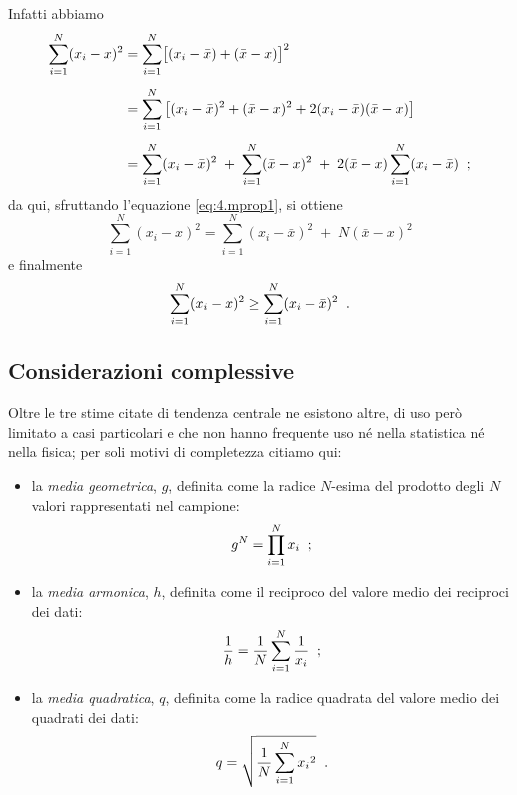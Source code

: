Infatti abbiamo
\begin{align*}
  \sum_{i=1}^N (x_i-x) ^2 &=
    \sum_{i=1}^N \bigl[ (x_i-\bar x) +
    (\bar x-x) \bigr] ^2 \\[1ex]
  &= \sum_{i=1}^N \left[ (x_i-\bar x) ^2 +
    (\bar x - x) ^2
    + 2 (x_i-\bar x) (\bar x - x) \right]
    \\[1ex]
  &= \sum_{i=1}^N (x_i-\bar x) ^2
    \;+\; \sum_{i=1}^N (\bar x-x) ^2
    \;+\; 2(\bar x-x)\sum_{i=1}^N (x_i-\bar x) \;\; ;
\end{align*}
da qui, sfruttando l'equazione \eqref{eq:4.mprop1}, si
ottiene
\begin{equation} \label{eq:4.mprop2}
  \sum_{i=1}^N (x_i-x) ^2 = \sum_{i=1}^N
    (x_i-\bar x)^2 \;+\; N(\bar x - x)^2
\end{equation}
e finalmente
\begin{equation*}
  \sum_{i=1}^N (x_i-x) ^2 \ge \sum_{i=1}^N
    (x_i-\bar x)^2 \;\; .
\end{equation*}%
%
%

\subsection{Considerazioni complessive}
Oltre le tre stime citate di tendenza centrale ne esistono
altre, di uso per\`o limitato a casi particolari e che non
hanno frequente uso n\'e nella statistica n\'e nella fisica;
per soli motivi di completezza citiamo qui:
\begin{itemize}
\item la \emph{media geometrica},%
  $g$, definita come la radice $N$-esima del prodotto degli
  $N$ valori rappresentati nel campione:
  \begin{equation*}
    g^N = \prod_{i=1}^N x_i \;\; ;
  \end{equation*}
\item la \emph{media armonica},%
  $h$, definita come il reciproco del valore medio dei
  reciproci dei dati:
  \begin{equation*}
    \frac{1}{h} = \frac{1}{N} \sum_{i=1}^N \frac{1}{x_i} \;\;
    ;
  \end{equation*}
\item la \emph{media quadratica},%
  $q$, definita come la radice quadrata del valore medio dei
  quadrati dei dati:
  \begin{equation*}
    q = \sqrt{ \frac{1}{N} \sum_{i=1}^N {x_i}^2 } \;\; .
  \end{equation*}
\end{itemize}

